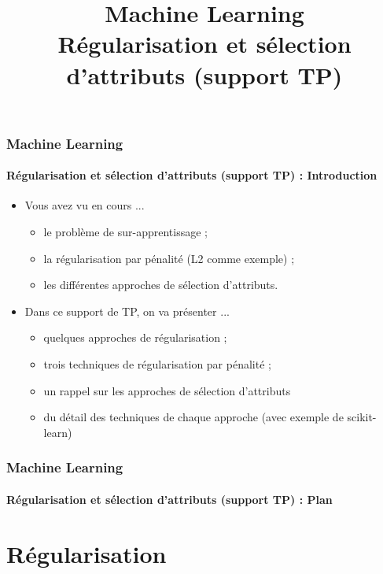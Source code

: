 \documentclass[xcolor=table]{beamer}
\title[ML : Régularisation et sélection d'attributs (TP)] %
{Machine Learning \\Régularisation et sélection d'attributs (support TP)}
\begin{document}
	
\begin{frame}
	\frametitle{Machine Learning}
	\framesubtitle{Régularisation et sélection d'attributs  (support TP) : Introduction}
	
	\begin{itemize}
		\item Vous avez vu en cours ...
		\begin{itemize}
			\item le problème de sur-apprentissage ;
			\item la régularisation par pénalité (L2 comme exemple) ;
			\item les différentes approches de sélection d'attributs.
		\end{itemize}
		\item Dans ce support de TP, on va présenter ...
		\begin{itemize}
			\item quelques approches de régularisation ;
			\item trois techniques de régularisation par pénalité ;
			\item un rappel sur les approches de sélection d'attributs
			\item du détail des techniques de chaque approche (avec exemple de scikit-learn)
		\end{itemize}
	\end{itemize}
\end{frame}


\begin{frame}
	\frametitle{Machine Learning}
	\framesubtitle{Régularisation et sélection d'attributs (support TP) : Plan}
	
	\begin{multicols}{2}
		\tableofcontents
	\end{multicols}
\end{frame}

\section{Régularisation}
\end{document}
